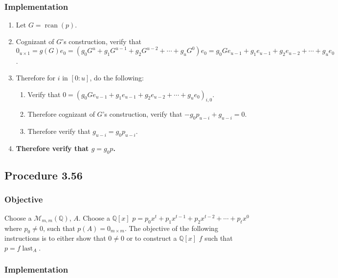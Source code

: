 \documentclass[twocolumn]{article}
\DeclareMathOperator{\rcan}{rcan}
\DeclareMathOperator{\last}{last}
\newcommand{\procedure}[2][]{\subsection*{Procedure #2 \ifthenelse{\equal{#1}{}}{}{(#1)}}\label{sec:procedure #2}}
\newcommand{\objective}{\subsubsection*{Objective}}
\newcommand{\implementation}{\subsubsection*{Implementation}}
\begin{document}
			\implementation
				\begin{enumerate}
					\item Let $G=\rcan(p)$.
					\item Cognizant of $G$'s construction, verify that $0_{u\times 1}=g(G)e_0=(g_0G^u+g_1G^{u-1}+g_2G^{u-2}+\cdots+g_uG^0)e_0=g_0Ge_{u-1}+g_1e_{u-1}+g_2e_{u-2}+\cdots+g_ue_0$.
					\item Therefore for $i$ in $[0:u]$, do the following:
					\begin{enumerate}
						\item Verify that $0=(g_0Ge_{u-1}+g_1e_{u-1}+g_2e_{u-2}+\cdots+g_ue_0)_{i,0}$.
						\item Therefore cognizant of $G$'s construction, verify that $-g_0p_{u-i}+g_{u-i}=0$.
						\item Therefore verify that $g_{u-i}=g_0p_{u-i}$.
					\end{enumerate}
					\item \textbf{Therefore verify that $g=g_0p$.}
				\end{enumerate}
		\procedure{3.56}
			\objective
				Choose a $\mathcal{M}_{m,m}(\mathbb{Q})$, $A$. Choose a $\mathbb{Q}[x]$ $p=p_0x^t+p_1x^{t-1}+p_2x^{t-2}+\cdots+p_tx^0$ where $p_0\ne 0$, such that $p(A)=0_{m\times m}$. The objective of the following instructions is to either show that $0\ne 0$ or to construct a $\mathbb{Q}[x]$ $f$ such that $p=f\last_A$.
			\implementation
\end{document}
